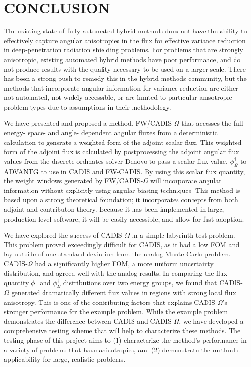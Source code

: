 \documentclass[12pt]{article}
\begin{document}
%
\section{CONCLUSION} 
\label{sect::conclusion}

The existing state of fully automated hybrid methods does not have the ability to effectively capture angular anisotropies in the flux for effective variance reduction in deep-penetration radiation shielding problems. For problems that are strongly anisotropic, existing automated hybrid methods have poor performance, and do not produce results with the quality necessary to be used on a larger scale. There has been a strong push to remedy this in the hybrid methods community, but the methods that incorporate angular information for variance reduction are either not automated, not widely accessible, or are limited to particular anisotropic problem types due to assumptions in their methodology. 

We have presented and proposed a method, FW/CADIS-$\Omega$ that accesses the full energy- space- and angle- dependent angular fluxes from a deterministic calculation to generate a weighted form of the adjoint scalar flux. This weighted form of the adjoint flux is calculated by postprocessing the adjoint angular flux values from the discrete ordinates solver Denovo to pass a scalar flux value, $\phi^{\dagger}_{\Omega}$ to ADVANTG to use in CADIS and FW-CADIS. By using this scalar flux quantity, the weight windows generated by FW/CADIS-$\Omega$ will incorporate angular information without explicitly using angular biasing techniques. This method is based upon a strong theoretical foundation; it incorporates concepts from both adjoint and contributon theory. Because it has been implemented in large, production-level software, it will be easily accessible, and allow for fast adoption. 

We have explored the success of CADIS-$\Omega$ in a simple labyrinth test problem. This problem proved exceedingly difficult for CADIS, as it had a low FOM and lay outside of one standard deviation from the analog Monte Carlo problem. CADIS-$\Omega$ had a significantly higher FOM, a more uniform uncertainty distribution, and agreed well with the analog results. In comparing the flux quantity $\phi^{\dagger}$ and $\phi^{\dagger}_{\Omega}$ distributions over two energy groups, we found that CADIS-$\Omega$ generated dramatically different flux values in regions with strong local flux anisotropy. This is one of the contributing factors that explains CADIS-$\Omega$'s stronger performance for the example problem. While the example problem demonstrates the difference between CADIS and CADIS-$\Omega$, we have developed a comprehensive testing scheme that will help to characterize these methods. The testing phase of this project aims to (1) characterize the method's performance in a variety of problems that have anisotropies, and (2) demonstrate the method's applicability for large, realistic problems. 
\end{document}
